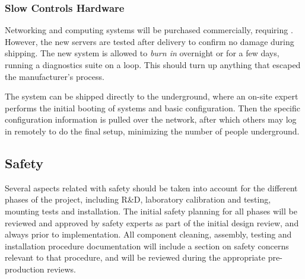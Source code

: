 \subsubsection{Slow Controls Hardware}
\label{sec:fdsp-slow-cryo-qc-sc-hard}

Networking and computing systems will be purchased commercially, requiring . However, the new servers are tested after delivery to confirm no damage during shipping. The new system is allowed to \textit{burn in} overnight or for a few days, 
running a diagnostics suite on a loop. This should turn up anything that escaped the manufacturer's  process.

The system can be shipped directly to the underground, 
where an on-site
expert performs the initial booting of systems and basic
configuration. Then the specific configuration information is pulled over
the network, after which others may log in remotely to do the final
setup, minimizing the number of people underground.


\subsection{Safety}
Several aspects related with safety should be taken into account for the different phases of the  project, including R\&D, laboratory calibration and testing, mounting tests and installation. 
The initial safety planning for all phases will be reviewed and approved by safety experts as part of the initial design review, and always prior to implementation. 
All component cleaning, assembly, testing  and installation procedure documentation will include a section on safety concerns
relevant to that procedure, and will be reviewed during the appropriate pre-production reviews.

